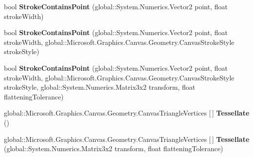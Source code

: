 \begin{DoxyCompactItemize}
\item 
\mbox{\label{class_microsoft_1_1_graphics_1_1_canvas_1_1_geometry_1_1_canvas_geometry_a487c9868385c05d9028ba59b0663e9f3}} 
bool {\bfseries Stroke\+Contains\+Point} (global\+::\+System.\+Numerics.\+Vector2 point, float stroke\+Width)
\item 
\mbox{\label{class_microsoft_1_1_graphics_1_1_canvas_1_1_geometry_1_1_canvas_geometry_add386d8e31ab0caf7b1b42d94e038fcd}} 
bool {\bfseries Stroke\+Contains\+Point} (global\+::\+System.\+Numerics.\+Vector2 point, float stroke\+Width, global\+::\+Microsoft.\+Graphics.\+Canvas.\+Geometry.\+Canvas\+Stroke\+Style stroke\+Style)
\item 
\mbox{\label{class_microsoft_1_1_graphics_1_1_canvas_1_1_geometry_1_1_canvas_geometry_a41adeb9ece02222f6a21e9635da34d5b}} 
bool {\bfseries Stroke\+Contains\+Point} (global\+::\+System.\+Numerics.\+Vector2 point, float stroke\+Width, global\+::\+Microsoft.\+Graphics.\+Canvas.\+Geometry.\+Canvas\+Stroke\+Style stroke\+Style, global\+::\+System.\+Numerics.\+Matrix3x2 transform, float flattening\+Tolerance)
\item 
\mbox{\label{class_microsoft_1_1_graphics_1_1_canvas_1_1_geometry_1_1_canvas_geometry_a0a66062ad10deeea0d4c354fa37dd1e5}} 
global\+::\+Microsoft.\+Graphics.\+Canvas.\+Geometry.\+Canvas\+Triangle\+Vertices \mbox{[}$\,$\mbox{]} {\bfseries Tessellate} ()
\item 
\mbox{\label{class_microsoft_1_1_graphics_1_1_canvas_1_1_geometry_1_1_canvas_geometry_ad81e27003f60c585c31cd07e1bd2a92a}} 
global\+::\+Microsoft.\+Graphics.\+Canvas.\+Geometry.\+Canvas\+Triangle\+Vertices \mbox{[}$\,$\mbox{]} {\bfseries Tessellate} (global\+::\+System.\+Numerics.\+Matrix3x2 transform, float flattening\+Tolerance)
\item 
\mbox{\label{class_microsoft_1_1_graphics_1_1_canvas_1_1_geometry_1_1_canvas_geometry_ac6b1c589bbbc82f3130c0f1164401983}} 

\end{DoxyCompactItemize}

